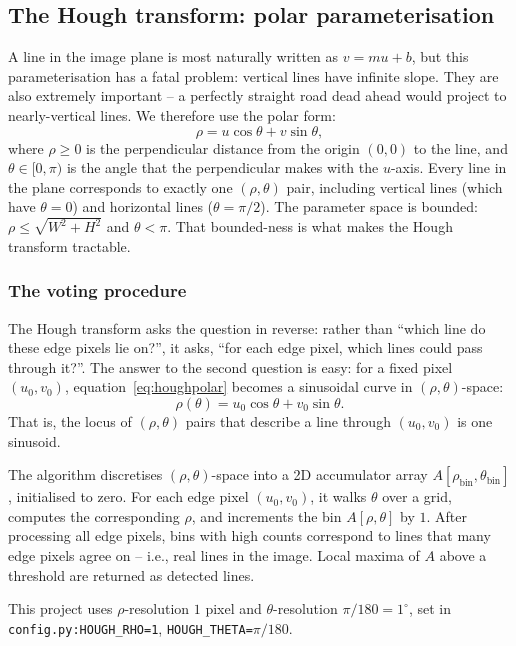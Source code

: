 \subsection{The Hough transform: polar parameterisation}

A line in the image plane is most naturally written as $v = m u + b$,
but this parameterisation has a fatal problem: vertical lines have
infinite slope. They are also extremely important -- a perfectly
straight road dead ahead would project to nearly-vertical lines. We
therefore use the polar form:
\begin{equation}
\rho = u\cos\theta + v\sin\theta,
\label{eq:houghpolar}
\end{equation}
where $\rho\ge 0$ is the perpendicular distance from the origin
$(0,0)$ to the line, and $\theta\in[0,\pi)$ is the angle that the
perpendicular makes with the $u$-axis. Every line in the plane
corresponds to exactly one $(\rho,\theta)$ pair, including vertical
lines (which have $\theta=0$) and horizontal lines ($\theta=\pi/2$).
The parameter space is bounded: $\rho\le\sqrt{W^2+H^2}$ and
$\theta<\pi$. That bounded-ness is what makes the Hough transform
tractable.

\subsubsection{The voting procedure}

The Hough transform asks the question in reverse: rather than ``which
line do these edge pixels lie on?'', it asks, ``for each edge pixel,
which lines could pass through it?''. The answer to the second
question is easy: for a fixed pixel $(u_0,v_0)$,
equation~\eqref{eq:houghpolar} becomes a sinusoidal curve in
$(\rho,\theta)$-space:
\[
\rho(\theta) = u_0\cos\theta + v_0\sin\theta.
\]
That is, the locus of $(\rho,\theta)$ pairs that describe a line
through $(u_0,v_0)$ is one sinusoid.

The algorithm discretises $(\rho,\theta)$-space into a 2D accumulator
array $A[\rho_{\text{bin}},\theta_{\text{bin}}]$, initialised to
zero. For each edge pixel $(u_0,v_0)$, it walks $\theta$ over a grid,
computes the corresponding $\rho$, and increments the bin
$A[\rho,\theta]$ by $1$. After processing all edge pixels, bins with
high counts correspond to lines that many edge pixels agree on --
i.e., real lines in the image. Local maxima of $A$ above a threshold
are returned as detected lines.

This project uses $\rho$-resolution $1$ pixel and $\theta$-resolution
$\pi/180 = 1^\circ$, set in \texttt{config.py:HOUGH\_RHO=1},
\texttt{HOUGH\_THETA=$\pi/180$}.

